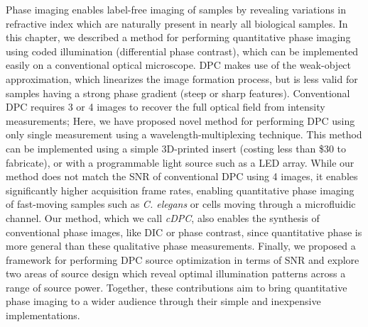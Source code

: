 Phase imaging enables label-free imaging of samples by revealing variations in refractive index which are naturally present in nearly all biological samples. In this chapter, we described a method for performing quantitative phase imaging using coded illumination (differential phase contrast), which can be implemented easily on a conventional optical microscope. DPC makes use of the weak-object approximation, which linearizes the image formation process, but is less valid for samples having a strong phase gradient (steep or sharp features). Conventional DPC requires 3 or 4 images to recover the full optical field from intensity measurements; Here, we have proposed novel method for performing DPC using only single measurement using a wavelength-multiplexing technique. This method can be implemented using a simple 3D-printed insert (costing less than \$30 to fabricate), or with a programmable light source such as a LED array. While our method does not match the SNR of conventional DPC using 4 images, it enables significantly higher acquisition frame rates, enabling quantitative phase imaging of fast-moving samples such as \textit{C. elegans} or cells moving through a microfluidic channel. Our method, which we call \textit{cDPC}, also enables the synthesis of conventional phase images, like DIC or phase contrast, since quantitative phase is more general than these qualitative phase measurements. Finally, we proposed a framework for performing DPC source optimization in terms of SNR and explore two areas of source design which reveal optimal illumination patterns across a range of source power. Together, these contributions aim to bring quantitative phase imaging to a wider audience through their simple and inexpensive implementations.
